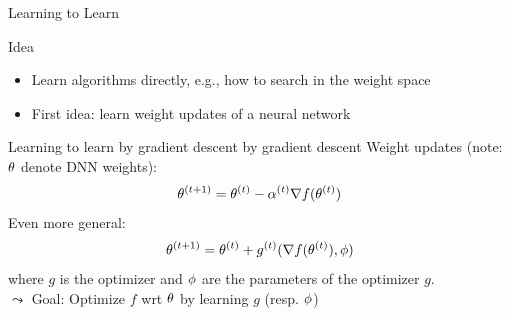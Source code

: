 \begin{frame}[c]{Learning to Learn}

\begin{block}{Idea}
\begin{itemize}
	\item Learn algorithms directly, e.g., how to search in the weight space
	\item First idea: learn weight updates of a neural network
\end{itemize}
\end{block}

\pause

\begin{block}{Learning to learn by gradient descent by gradient descent\newline {}}
Weight updates (note: $\theta$ denote DNN weights):
\begin{equation}
\theta^{(t+1)} = \theta^{(t)} - \alpha^{(t)} \nabla f(\theta^{(t)}) \nonumber
\end{equation}
\pause
Even more general:
\begin{equation}
\theta^{(t+1)} = \theta^{(t)} + g^{(t)}(\nabla f(\theta^{(t)}), \phi) \nonumber
\end{equation}
where $g$ is the optimizer and $\phi$ are the parameters of the optimizer $g$.\\
\pause
$\leadsto$ \alert{Goal: Optimize $f$ wrt $\theta$ by learning $g$ (resp. $\phi$)}
\end{block}

\end{frame}
